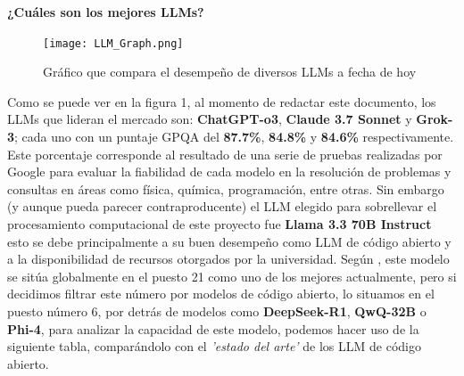 \documentclass{article}
\begin{document}
\textbf{¿Cuáles son los mejores LLMs?} 

\begin{figure}[H] %
\centering
\texttt{[image: LLM\_Graph.png]}
\caption{Gráfico que compara el desempeño de diversos LLMs a fecha de hoy} 
\cite{llm-stats}
\label{tab:LLM_Graph}
\end{figure}

Como se puede ver en la figura 1, al momento de redactar este documento, los LLMs que lideran el mercado son: \textbf{ChatGPT-o3}, \textbf{Claude 3.7 Sonnet} y \textbf{Grok-3}; cada uno con un puntaje GPQA del \textbf{87.7\%}, \textbf{84.8\%} y \textbf{84.6\%} respectivamente. Este porcentaje corresponde al resultado de una serie de pruebas realizadas por Google para evaluar la fiabilidad de cada modelo en la resolución de problemas y consultas en áreas como física, química, programación, entre otras.
Sin embargo (y aunque pueda parecer contraproducente) el LLM elegido para sobrellevar el procesamiento computacional de este proyecto fue \textbf{Llama 3.3 70B Instruct} esto se debe principalmente a su buen desempeño como LLM de código abierto y a la disponibilidad de recursos otorgados por la universidad. 
Según \cite{llm-stats}, este modelo se sitúa globalmente en el puesto 21 como uno de los mejores actualmente, pero si decidimos filtrar este número por modelos de código abierto, lo situamos en el puesto número 6, por detrás de modelos como \textbf{DeepSeek-R1}, \textbf{QwQ-32B} o \textbf{Phi-4}, para analizar la capacidad de este modelo, podemos hacer uso de la siguiente tabla, comparándolo con el \textit{'estado del arte'} de los LLM de código abierto. 

\begin{table}[H]
\centering
{}
\caption{Comparativa entre modelos de lenguaje de gran tamaño (LLMs)}
\label{tab:comparativa_llm}
\end{table}
\end{document}
